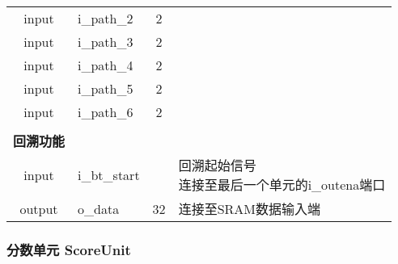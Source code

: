 \documentclass[UTF8]{ctexart}
\begin{document}
\begin{table}[!h]
\begin{tabular}{clcl}
        input & i\_path\_2 & 2 & \\[5pt]
        input & i\_path\_3 & 2 & \\[5pt]
        input & i\_path\_4 & 2 & \\[5pt]
        input & i\_path\_5 & 2 & \\[5pt]
        input & i\_path\_6 & 2 & \\[5pt]
        \\
        \textbf{回溯功能} &&& \\[5pt]
        input & i\_bt\_start && \makecell[l]{回溯起始信号\\连接至最后一个单元的i\_outena端口\\[5pt]} \\[5pt]
        output & o\_data & 32 & 连接至SRAM数据输入端 \\[5pt]
        \bottomrule
    \end{tabular}
\end{table}

\newpage
\subsubsection{分数单元 ScoreUnit}
\end{document}
